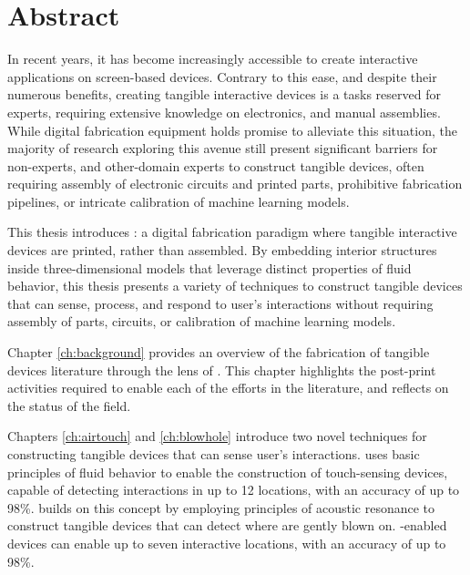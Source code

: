 \begingroup
	\let\clearpage\relax
	\let\cleardoublepage\relax
	\let\cleardoublepage\relax

	\chapter*{Abstract}
		In recent years, it has become increasingly accessible to create interactive
		applications on screen-based devices. Contrary to this ease, and despite
		their numerous benefits, creating tangible interactive devices is a tasks
		reserved for experts, requiring extensive knowledge on electronics, and
		manual assemblies. While digital fabrication equipment holds promise to
		alleviate this situation, the majority of research exploring this avenue
		still present significant barriers for non-experts, and other-domain experts
		to construct tangible devices, often requiring assembly of electronic
		circuits and printed parts, prohibitive fabrication pipelines, or intricate
		calibration of machine learning models.

		This thesis introduces \emph{\papf}: a digital fabrication paradigm where
		tangible interactive devices are printed, rather than assembled. By
		embedding interior structures inside three-dimensional models that leverage
		distinct properties of fluid behavior, this thesis presents a variety of
		techniques to construct tangible devices that can sense, process, and
		respond to user's interactions without requiring assembly of parts,
		circuits, or calibration of machine learning models.

		Chapter \ref{ch:background} provides an overview of the fabrication of
		tangible devices literature through the lens of \papf. This chapter
		highlights the post-print activities required to enable each of the efforts
		in the literature, and reflects on the status of the field.

		Chapters \ref{ch:airtouch} and \ref{ch:blowhole} introduce two novel
		techniques for constructing tangible devices that can sense user's
		interactions. \at uses basic principles of fluid behavior to enable the
		construction of touch-sensing devices, capable of detecting interactions in
		up to 12 locations, with an accuracy of up to 98\%. \bh builds on this
		concept by employing principles of acoustic resonance to construct tangible
		devices that can detect where are gently blown on. \bh-enabled devices can
		enable up to seven interactive locations, with an accuracy of up to 98\%.

